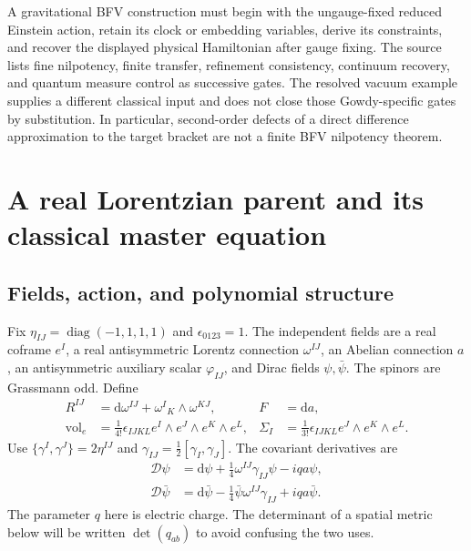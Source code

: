 A gravitational BFV construction must begin with the ungauge-fixed reduced Einstein action, retain its clock or embedding variables, derive its constraints, and recover the displayed physical Hamiltonian after gauge fixing. The source lists fine nilpotency, finite transfer, refinement consistency, continuum recovery, and quantum measure control as successive gates. The resolved vacuum example supplies a different classical input and does not close those Gowdy-specific gates by substitution. In particular, second-order defects of a direct difference approximation to the target bracket are not a finite BFV nilpotency theorem.

\section{A real Lorentzian parent and its classical master equation}
\label{c:constraints:parent}

\subsection{Fields, action, and polynomial structure}
Fix $\eta_{IJ}=\operatorname{diag}(-1,1,1,1)$ and $\epsilon_{0123}=1$. The independent fields are a real coframe $e^I$, a real antisymmetric Lorentz connection $\omega^{IJ}$, an Abelian connection $a$, an antisymmetric auxiliary scalar $\varphi_{IJ}$, and Dirac fields $\psi,\bar\psi$. The spinors are Grassmann odd. Define
\begin{align}
 R^{IJ}&=\mathrm d\omega^{IJ}+\omega^I{}_K\wedge\omega^{KJ},
 &F&=\mathrm da,\\
 \operatorname{vol}_e&=\tfrac1{4!}\epsilon_{IJKL}
                         e^I\wedge e^J\wedge e^K\wedge e^L,
 &\Sigma_I&=\tfrac1{3!}\epsilon_{IJKL}e^J\wedge e^K\wedge e^L.
\end{align}
Use $\{\gamma^I,\gamma^J\}=2\eta^{IJ}$ and
$\gamma_{IJ}=\tfrac12[\gamma_I,\gamma_J]$. The covariant derivatives are
\begin{align}
 \mathcal D\psi&=\mathrm d\psi+\tfrac14\omega^{IJ}\gamma_{IJ}\psi-iq a\psi,\\
 \mathcal D\bar\psi&=\mathrm d\bar\psi-\tfrac14\bar\psi\omega^{IJ}\gamma_{IJ}+iq a\bar\psi.
\end{align}
The parameter $q$ here is electric charge. The determinant of a spatial metric below will be written $\det(q_{ab})$ to avoid confusing the two uses.

